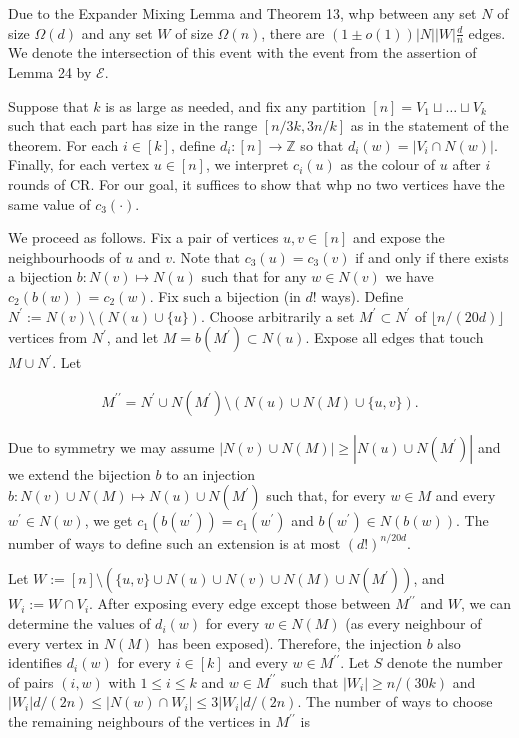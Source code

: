 \documentclass[10pt,a4paper]{article}
\begin{document}
Due to the Expander Mixing Lemma and Theorem 13, whp between any set $N$ of size $\Omega(d)$ and any set $W$ of size $\Omega(n)$, there are $(1\pm o(1))|N||W|\frac{d}{n}$ edges. We denote the intersection of this event with the event from the assertion of Lemma 24 by $\mathcal{E}$.\par




Suppose that $k$ is as large as needed, and fix any partition $[n]=V_{1}\sqcup\ldots\sqcup V_{k}$ such that each part has size in the range $[n/3k,3n/k]$ as in the statement of the theorem. For each $i\in[k]$, define $d_{i}:[n]\to\mathbb{Z}$ so that $d_{i}(w)=|V_{i}\cap N(w)|$. Finally, for each vertex $u\in[n]$, we interpret $c_{i}(u)$ as the colour of $u$ after $i$ rounds of CR. For our goal, it suffices to show that whp
no two vertices have the same value of $c_{3}(\cdot)$.\par




We proceed as follows. Fix a pair of vertices $u,v\in[n]$ and expose the neighbourhoods of $u$ and $v$.
Note that $c_{3}(u)=c_{3}(v)$ if and only if there exists a bijection $b:N(v)\mapsto N(u)$ such that for any $w\in N(v)$ we have $c_{2}(b(w))=c_{2}(w)$. Fix such a bijection (in $d!$ ways). Define $N^{\prime}:=N(v)\setminus(N(u)\cup\{u\})$.
Choose arbitrarily a set $M^{\prime}\subset N^{\prime}$ of $\lfloor n/(20d)\rfloor$ vertices from $N^{\prime}$, and let $M=b(M^{\prime})\subset N(u)$. Expose all edges that touch $M\cup N^{\prime}$. Let\par


\[\begin{gathered}
M^{\prime\prime}=N^{\prime}\cup N(M^{\prime})\setminus(N(u)\cup N(M)\cup\{u,v\}).
\end{gathered}\]


Due to symmetry we may assume $|N(v)\cup N(M)|\geq|N(u)\cup N(M^{\prime})|$ and we extend the bijection $b$ to an injection $b:N(v)\cup N(M)\mapsto N(u)\cup N(M^{\prime})$ such that, for every $w\in M$ and every $w^{\prime}\in N(w)$, we get $c_{1}(b(w^{\prime}))=c_{1}(w^{\prime})$ and $b(w^{\prime})\in N(b(w))$. The number of ways to define such an extension is at most $(d!)^{n/20d}$.\par




Let $W:=[n]\setminus(\{u,v\}\cup N(u)\cup N(v)\cup N(M)\cup N(M^{\prime}))$, and $W_{i}:=W\cap V_{i}$. After exposing every edge except those between $M^{\prime\prime}$ and $W$, we can determine the values of $d_{i}(w)$ for every $w\in N(M)$ (as every neighbour of every vertex in $N(M)$ has been exposed). Therefore, the injection $b$ also identifies $d_{i}(w)$ for every $i\in[k]$ and every $w\in M^{\prime\prime}$. Let $S$ denote the number of pairs $(i,w)$ with $1\leq i\leq k$ and $w\in M^{\prime\prime}$ such that $|W_{i}|\geq n/(30k)$ and $|W_{i}|d/(2n)\leq|N(w)\cap W_{i}|\leq 3|W_{i}|d/(2n)$. The number of ways to choose the remaining neighbours of the vertices in $M^{\prime\prime}$ is\par
\end{document}
